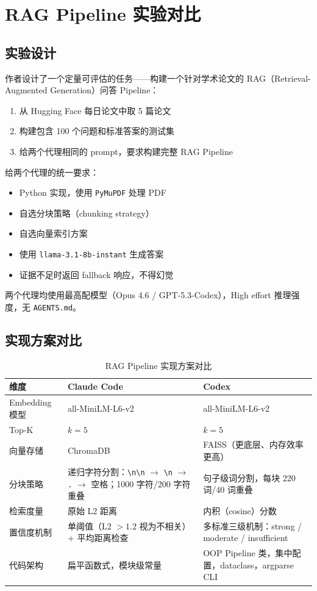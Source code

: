\section{RAG Pipeline 实验对比}

\subsection{实验设计}

作者设计了一个定量可评估的任务——构建一个针对学术论文的 RAG（Retrieval-Augmented Generation）问答 Pipeline：

\begin{enumerate}
    \item 从 Hugging Face 每日论文中取 5 篇论文
    \item 构建包含 100 个问题和标准答案的测试集
    \item 给两个代理相同的 prompt，要求构建完整 RAG Pipeline
\end{enumerate}

给两个代理的统一要求：
\begin{itemize}
    \item Python 实现，使用 \texttt{PyMuPDF} 处理 PDF
    \item 自选分块策略（chunking strategy）
    \item 自选向量索引方案
    \item 使用 \texttt{llama-3.1-8b-instant} 生成答案
    \item 证据不足时返回 fallback 响应，不得幻觉
\end{itemize}

两个代理均使用最高配模型（Opus 4.6 / GPT-5.3-Codex），High effort 推理强度，无 \texttt{AGENTS.md}。

\subsection{实现方案对比}

\begin{table}[H]
\centering
\caption{RAG Pipeline 实现方案对比}
\begin{tabular}{lp{5cm}p{5cm}}
\toprule
\textbf{维度} & \textbf{Claude Code} & \textbf{Codex} \\
\midrule
Embedding 模型 & all-MiniLM-L6-v2 & all-MiniLM-L6-v2 \\
\addlinespace
Top-K & $k=5$ & $k=5$ \\
\addlinespace
向量存储 & ChromaDB & FAISS（更底层、内存效率更高） \\
\addlinespace
分块策略 & 递归字符分割：\texttt{\textbackslash n\textbackslash n} $\to$ \texttt{\textbackslash n} $\to$ \texttt{.} $\to$ 空格；1000 字符/200 字符重叠 & 句子级词分割，每块 220 词/40 词重叠 \\
\addlinespace
检索度量 & 原始 L2 距离 & 内积（cosine）分数 \\
\addlinespace
置信度机制 & 单阈值（L2 $> 1.2$ 视为不相关）+ 平均距离检查 & 多标准三级机制：strong / moderate / insufficient \\
\addlinespace
代码架构 & 扁平函数式，模块级常量 & OOP Pipeline 类，集中配置，dataclass，argparse CLI \\
\bottomrule
\end{tabular}
\end{table}

